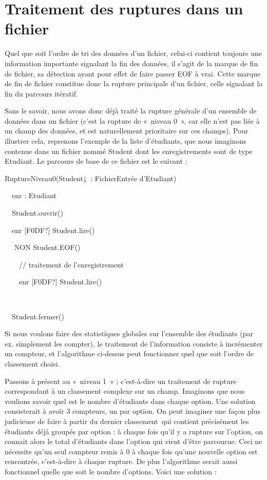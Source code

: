 \section[Traitement des ruptures dans un fichier]{Traitement des
ruptures dans un fichier}
{
Quel que soit l’ordre de tri des données d’un fichier, celui-ci contient
toujours une information importante signalant la fin des données, il
s’agit de la marque de fin de fichier, sa détection ayant pour effet de
faire passer EOF à vrai. Cette marque de fin de fichier constitue donc
la rupture principale d’un fichier, celle signalant la fin du parcours
itératif. }

{
Sans le savoir, nous avons donc déjà traité la rupture générale d’un
ensemble de données dans un fichier (c’est la rupture de «~niveau 0~»,
car elle n’est pas liée à un champ des données, et est naturellement
prioritaire sur ces champs). Pour illustrer cela, reprenons l’exemple
de la liste d’étudiants, que nous imaginons contenue dans un fichier
nommé Student dont les enregistrements sont de type Etudiant. Le
parcours de base de ce fichier est le suivant :}

{\sffamily
{} RuptureNiveau0(Student↓~: FichierEntrée
d’Etudiant)}

{\sffamily
\ \ enr : Etudiant}

{\sffamily
\textit{\ \ }Student.ouvrir()}

{\sffamily
\ \ enr \textrm{[F0DF?]} Student.lire()}

{\sffamily
\ \   NON Student.EOF()
\ \ \ \ \ \ \ \ }

{\sffamily
\ \ \ \ // traitement de l’enregistrement}

{\sffamily
\ \ \ \ enr \textrm{[F0DF?]} Student.lire()}

{\sffamily
\ \    }

{\sffamily
\ \ Student.fermer()}

{\sffamily
{} }

{
Si nous voulons faire des statistiques globales sur l’ensemble des
étudiants (par ex. simplement les compter), le traitement de
l’information consiste à incrémenter un compteur, et l’algorithme
ci-dessus peut fonctionner quel que soit l’ordre de classement choisi.}

{
Passons à présent au «~niveau 1~» ; c’est-à-dire un traitement de
rupture correspondant à un classement complexe sur un champ. Imaginons
que nous voulions savoir quel est le nombre d’étudiants dans chaque
option. Une solution consisterait à avoir 3 compteurs, un par option.
On peut imaginer une façon plus judicieuse de faire à partir du dernier
classement~qui contient précisément les étudiants déjà groupés par
option : à chaque fois qu’il y a rupture sur l’option, on connait alors
le total d’étudiants dans l’option qui vient d’être parcourue. Ceci ne
nécessite qu’un seul compteur remis à 0 à chaque fois qu’une nouvelle
option est rencontrée, c’est-à-dire à chaque rupture. De plus
l’algorithme serait aussi fonctionnel quelle que soit le nombre
d’options. Voici une solution : }

